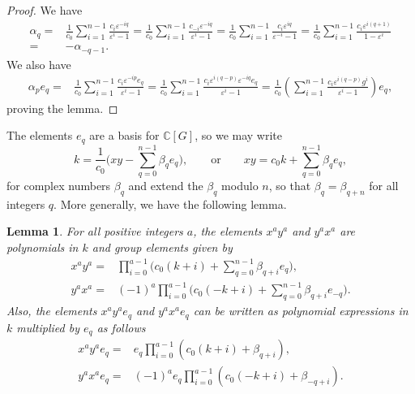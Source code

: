\documentclass[pdftex]{sigma}
\newcommand\CC{\mathbb{C}}
\newcommand\eps{\varepsilon}
\numberwithin{equation}{section}
\newtheorem{Lemma}[Theorem]{Lemma}
\theoremstyle{definition}
\begin{document}
\begin{proof}
 We have
 \begin{align*}
 \alpha_q ={}& \frac1{c_0}
 \sum\limits_{i = 1}^{n - 1}
 \frac{c_i \eps^{-iq}}{\eps^i - 1}
 = \frac1{c_0} \sum\limits_{i = 1}^{n - 1}
 \frac{c_{-i} \eps^{-iq}}{\eps^i - 1}
 = \frac1{c_0} \sum\limits_{i = 1}^{n - 1}
 \frac{c_i \eps^{iq}}{\eps^{-i} - 1}
 = \frac1{c_0} \sum\limits_{i = 1}^{n - 1}
 \frac{c_i \eps^{i (q + 1)}}{1 - \eps^i}\\
 ={}& -\alpha_{-q - 1}.
 \end{align*}
 We also have
 \begin{align*}
 \alpha_p e_q
 ={}& \frac1{c_0} \sum\limits_{i = 1}^{n - 1}
 \frac{c_i \eps^{-ip} e_q}{\eps^i - 1} = \frac1{c_0} \sum\limits_{i = 1}^{n - 1}
 \frac{c_i \eps^{i(q - p)}
 \eps^{-iq} e_q}{\eps^i - 1} = \frac1{c_0} \left( \sum\limits_{i = 1}^{n - 1}
 \frac{c_i \eps^{i (q - p)} g^i}{\eps^i - 1}
 \right) e_q,
 \end{align*}
 proving the lemma.
\end{proof}

The elements $e_q$ are a basis for $\CC[G]$,
so we may write
\begin{equation*}
 k = \frac1{c_0} \Bigg( xy -
 \sum\limits_{q = 0}^{n - 1} \beta_q e_q \Bigg),
 \qquad \textrm{or} \qquad
 xy = c_0 k + \sum\limits_{q = 0}^{n - 1} \beta_q e_q,
\end{equation*}
for complex numbers $\beta_q$
and extend the $\beta_q$ modulo $n$,
so that $\beta_q = \beta_{q + n}$ for all integers $q$.
More generally, we have the following lemma.

\begin{Lemma}
 \label{lem:xy_poly}
 For all positive integers $a$,
 the elements $x^a y^a$ and $y^a x^a$
 are polynomials in $k$ and group elements
 given by
 \begin{align*}
 x^a y^a ={}& \prod_{i = 0}^{a - 1} \Bigg( c_0 (k + i)
 + \sum\limits_{q = 0}^{n - 1} \beta_{q + i} e_q \Bigg),
 \\
 y^a x^a ={}& (-1)^a \prod\limits_{i = 0}^{a - 1}
 \Bigg( c_0 (-k + i)
 + \sum\limits_{q = 0}^{n - 1} \beta_{q + i} e_{-q}
 \Bigg).
 \end{align*}
 Also, the elements $x^a y^a e_q$ and $y^a x^a e_q$
 can be written as polynomial expressions in $k$
 multiplied by $e_q$ as follows
 \begin{align*}
 x^a y^a e_q ={}& e_q \prod\limits_{i = 0}^{a - 1}
 (c_0 (k + i) + \beta_{q + i}), \\
 y^a x^a e_q ={}& (-1)^a e_q \prod\limits_{i = 0}^{a - 1}
 (c_0 (-k + i) + \beta_{-q + i}).
 \end{align*}
\end{Lemma}
\end{document}
